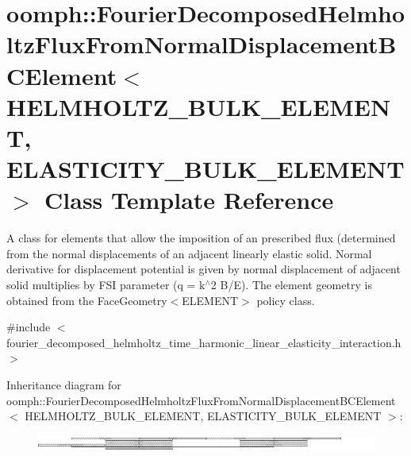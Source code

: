 \hypertarget{classoomph_1_1FourierDecomposedHelmholtzFluxFromNormalDisplacementBCElement}{}\section{oomph\+:\+:Fourier\+Decomposed\+Helmholtz\+Flux\+From\+Normal\+Displacement\+B\+C\+Element$<$ H\+E\+L\+M\+H\+O\+L\+T\+Z\+\_\+\+B\+U\+L\+K\+\_\+\+E\+L\+E\+M\+E\+NT, E\+L\+A\+S\+T\+I\+C\+I\+T\+Y\+\_\+\+B\+U\+L\+K\+\_\+\+E\+L\+E\+M\+E\+NT $>$ Class Template Reference}
\label{classoomph_1_1FourierDecomposedHelmholtzFluxFromNormalDisplacementBCElement}


A class for elements that allow the imposition of an prescribed flux (determined from the normal displacements of an adjacent linearly elastic solid. Normal derivative for displacement potential is given by normal displacement of adjacent solid multiplies by F\+SI parameter (q = k$^\wedge$2 B/E). The element geometry is obtained from the Face\+Geometry$<$\+E\+L\+E\+M\+E\+N\+T$>$ policy class.  




{\ttfamily \#include $<$fourier\+\_\+decomposed\+\_\+helmholtz\+\_\+time\+\_\+harmonic\+\_\+linear\+\_\+elasticity\+\_\+interaction.\+h$>$}

Inheritance diagram for oomph\+:\+:Fourier\+Decomposed\+Helmholtz\+Flux\+From\+Normal\+Displacement\+B\+C\+Element$<$ H\+E\+L\+M\+H\+O\+L\+T\+Z\+\_\+\+B\+U\+L\+K\+\_\+\+E\+L\+E\+M\+E\+NT, E\+L\+A\+S\+T\+I\+C\+I\+T\+Y\+\_\+\+B\+U\+L\+K\+\_\+\+E\+L\+E\+M\+E\+NT $>$\+:\begin{figure}[H]
\begin{center}
\leavevmode
\includegraphics[height=0.528926cm]{classoomph_1_1FourierDecomposedHelmholtzFluxFromNormalDisplacementBCElement}
\end{center}
\end{figure}
